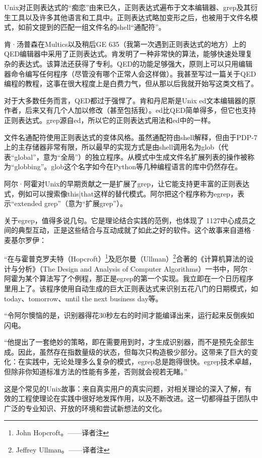 \documentclass[a4paper,12pt,UTF8,twoside]{ctexbook}
\begin{document}
Unix对正则表达式的“痴恋”由来已久，正则表达式遍布于文本编辑器、grep及其衍生工具以及许多其他语言和工具中。正则表达式略加变形之后，也被用于文件名模式，如前文提到的匹配一组文件名的shell“通配符”。

肯·汤普森在Multics以及稍后GE 635（我第一次遇到正则表达式的地方）上的QED编辑器中采用了正则表达式。肯发明了一种非常快的算法，能够快速处理复杂的表达式。该算法还获得了专利。QED的功能足够强大，原则上可以只用编辑器命令编写任何程序（尽管没有哪个正常人会这样做）。我甚至写过一篇关于QED编程的教程，这事在很大程度上是白费力气，但从那以后我就开始写这类文档了。

对于大多数任务而言，QED都过于强悍了。肯和丹尼斯是Unix ed文本编辑器的原作者，后来又有几个人加以修改（甚至包括我）。ed比QED简单得多，但它也支持正则表达式。grep源自ed，所以它的正则表达式用法和ed中的一样。

文件名通配符使用正则表达式的变体风格。虽然通配符由shell解释，但由于PDP-7上的主存储器非常有限，所以最早的实现方式是由shell调用名为glob（代表“global”，意为“全局”）的独立程序。从模式中生成文件名扩展列表的操作被称为“globbing”。glob这个名字如今在Python等几种编程语言的库中仍然存在。

阿尔·阿霍对Unix的早期贡献之一是扩展了grep，让它能支持更丰富的正则表达式，例如可以搜索像this|that这样的替代模式。阿尔把这个程序称为egrep，表示“extended grep”（意为“扩展grep”）。

关于egrep，值得多说几句。它是理论结合实践的范例，也体现了 1127中心成员之间的典型互动，正是这些结合与互动成就了如此之好的软件。这个故事来自道格·麦基尔罗伊：

“在与霍普克罗夫特（Hopcroft）\footnote{John Hopcroft。——译者注}及厄尔曼（Ullman）\footnote{Jeffrey Ullman。——译者注}合著的《计算机算法的设计与分析》（The Design and Analysis of Computer Algorithms）一书中，阿尔·阿霍为某个算法写了个例程，那正是egrep的第一个实现。我立即在一个日历程序里用上了。该程序使用自动生成的巨大正则表达式来识别五花八门的日期模式，如today、tomorrow、until the next business day等。

“令阿尔懊恼的是，识别器得花30秒左右的时间才能编译出来，运行起来反倒疾如闪电。

“他提出了一套绝妙的策略，即在需要用到时，才生成识别器，而不是预先全部生成。因此，虽然存在指数量级的状态，但每次只构造极少部分。这带来了巨大的变化：在实践中，无论处理多么复杂的模式，egrep总是跑得很快。egrep技术卓越，但除非你知道标准方法的性能有多差，否则就会视若无睹。”

这是个常见的Unix故事：来自真实用户的真实问题，对相关理论的深入了解，有效的工程使理论在实践中很好地发挥作用，以及不断改进。这一切都得益于团队中广泛的专业知识、开放的环境和尝试新想法的文化。
\end{document}
